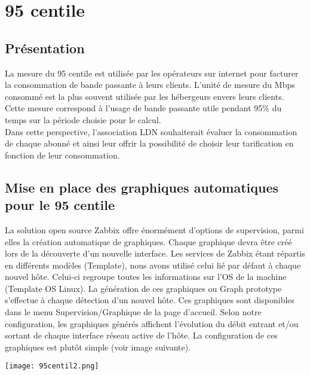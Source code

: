 \section{95 centile}
	\subsection{Présentation}
		\vspace{0.3cm}

		La mesure du 95 centile est utilisée par les opérateurs sur internet pour facturer la consommation de bande passante à leurs clients. L'unité de mesure du Mbps consommé est la plus souvent utilisée par les hébergeurs envers leurs clients.\\

		Cette mesure correspond à l'usage de bande passante utile pendant 95\% du temps sur la période choisie pour le calcul.\\

		Dans cette perspective, l'association LDN souhaiterait évaluer la consommation de chaque abonné et ainsi leur offrir la possibilité de choisir leur tarification en fonction de leur consommation.\\

	\subsection{Mise en place des graphiques automatiques pour le 95 centile}
		\vspace{0.3cm}

		La solution open source Zabbix offre énormément d'options de supervision, parmi elles la création automatique de graphiques. Chaque graphique devra être créé lors de la découverte d'un nouvelle interface. Les services de Zabbix étant répartis en différents modèles (Template), nous avons utilisé celui lié par défaut à chaque nouvel hôte. Celui-ci regroupe toutes les informations sur l'OS de la machine (Template OS Linux). La génération de ces graphiques ou Graph prototype s'effectue à chaque détection d'un nouvel hôte. Ces graphiques sont disponibles dans le menu Supervision/Graphique de la page d'accueil. Selon notre configuration, les graphiques générés affichent l'évolution du débit entrant et/ou sortant de chaque interface réseau active de l'hôte. La configuration de ces graphiques est plutôt simple (voir image suivante).\\

\begin{center}

		\texttt{[image: 95centil2.png]}

		\vspace{0.3cm}

\end{center}


